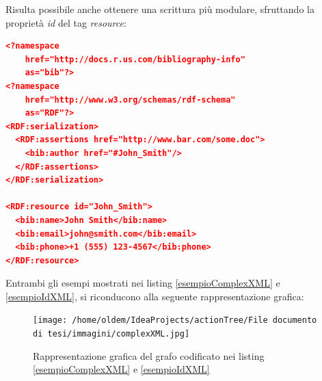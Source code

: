 \documentclass[12pt,a4paper,twoside]{book}
\begin{document}
Risulta possibile anche ottenere una scrittura più modulare, sfruttando la proprietà \textit{id} del tag \textit{resource}:
\begin{lstlisting}[language=json,firstnumber=1,caption={Esempio di metadato conforme ad RDF in XML},captionpos=b,label=esempioIdXML]
<?namespace 
	href="http://docs.r.us.com/bibliography-info" 
	as="bib"?> 
<?namespace 
	href="http://www.w3.org/schemas/rdf-schema"
	as="RDF"?> 
<RDF:serialization> 
  <RDF:assertions href="http://www.bar.com/some.doc"> 
    <bib:author href="#John_Smith"/> 
  </RDF:assertions> 
</RDF:serialization>

<RDF:resource id="John_Smith"> 
  <bib:name>John Smith</bib:name> 
  <bib:email>john@smith.com</bib:email> 
  <bib:phone>+1 (555) 123-4567</bib:phone> 
</RDF:resource> 
\end{lstlisting}
Entrambi gli esempi mostrati nei listing \ref{esempioComplexXML} e \ref{esempioIdXML}, si riconducono alla seguente rappresentazione grafica:
\begin{figure}[H]
\centering
\texttt{[image: /home/oldem/IdeaProjects/actionTree/File documento di tesi/immagini/complexXML.jpg]}
\caption{Rappresentazione grafica del grafo codificato nei listing \ref{esempioComplexXML} e \ref{esempioIdXML}}
\label{imgEsempioComplexXML}
\end{figure}
\end{document}
